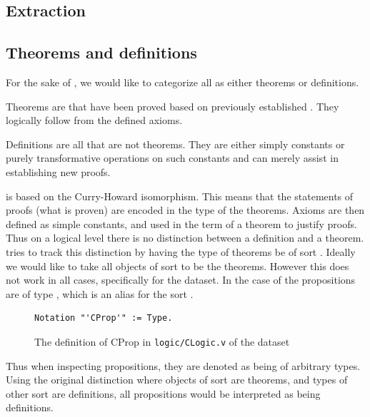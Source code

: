 \subsection{Extraction}
\label{section:extraction}


\subsection{Theorems and definitions}
\label{section:thmsdefs}

For the sake of \premiseselection, we would like to categorize all \coqobjs as either theorems or definitions.
\begin{definition}[theorem]
    Theorems are \coqobjs that have been proved based on previously established \coqobjs.
    They logically follow from the defined axioms.
\end{definition}

\begin{definition}[definition]
    Definitions are all \coqobjs that are not theorems.
    They are either simply constants or purely transformative operations on such constants
    and can merely assist in establishing new proofs.
\end{definition}

\coq is based on the Curry-Howard isomorphism.
This means that the statements of proofs (what is proven) are encoded in the type of the theorems.
Axioms are then defined as simple constants, and used in the term of a theorem to justify proofs.
Thus on a logical level there is no distinction between a definition and a theorem.
\coq tries to track this distinction by having the type of theorems be of sort \sortprop.
Ideally we would like to take all objects of sort \sortprop to be the theorems.
However this does not work in all cases, specifically for the \corn dataset.
In the case of \corn the propositions are of type \cprop, which is an alias for the sort \sorttype.

\begin{figure}[H]
	\begin{lstlisting}[language=Coq, mathescape]
Notation "'CProp'" := Type.
	\end{lstlisting}
	\caption{The definition of CProp in \texttt{logic/CLogic.v} of the \corn dataset}
\end{figure}

Thus when inspecting \corn propositions, they are denoted as being of arbitrary types.
Using the original distinction where objects of sort \sortprop are theorems, and types of other sort are definitions,
all \corn propositions would be interpreted as being definitions.

